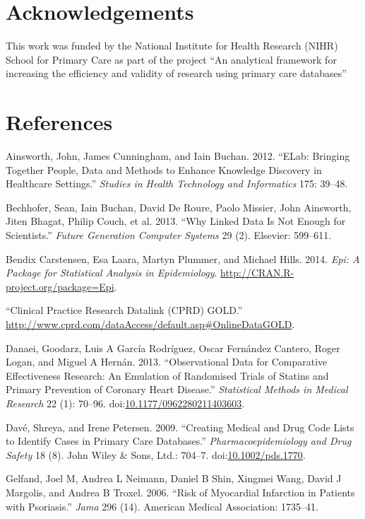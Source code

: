 \documentclass[]{article}
\begin{document}
\section{Acknowledgements}\label{acknowledgements}

This work was funded by the National Institute for Health Research
(NIHR) School for Primary Care as part of the project ``An analytical
framework for increasing the efficiency and validity of research using
primary care databases''

\section*{References}\label{references}

Ainsworth, John, James Cunningham, and Iain Buchan. 2012. ``ELab:
Bringing Together People, Data and Methods to Enhance Knowledge
Discovery in Healthcare Settings.'' \emph{Studies in Health Technology
and Informatics} 175: 39--48.

Bechhofer, Sean, Iain Buchan, David De Roure, Paolo Missier, John
Ainsworth, Jiten Bhagat, Philip Couch, et al. 2013. ``Why Linked Data Is
Not Enough for Scientists.'' \emph{Future Generation Computer Systems}
29 (2). Elsevier: 599--611.

Bendix Carstensen, Esa Laara, Martyn Plummer, and Michael Hills. 2014.
\emph{Epi: A Package for Statistical Analysis in Epidemiology}.
\url{http://CRAN.R-project.org/package=Epi}.

``Clinical Practice Research Datalink (CPRD) GOLD.''
\url{http://www.cprd.com/dataAccess/default.asp\#OnlineDataGOLD}.

Danaei, Goodarz, Luis A García Rodríguez, Oscar Fernández Cantero, Roger
Logan, and Miguel A Hernán. 2013. ``Observational Data for Comparative
Effectiveness Research: An Emulation of Randomised Trials of Statins and
Primary Prevention of Coronary Heart Disease.'' \emph{Statistical
Methods in Medical Research} 22 (1): 70--96.
doi:\href{http://dx.doi.org/10.1177/0962280211403603}{10.1177/0962280211403603}.

Davé, Shreya, and Irene Petersen. 2009. ``Creating Medical and Drug Code
Lists to Identify Cases in Primary Care Databases.''
\emph{Pharmacoepidemiology and Drug Safety} 18 (8). John Wiley \& Sons,
Ltd.: 704--7.
doi:\href{http://dx.doi.org/10.1002/pds.1770}{10.1002/pds.1770}.

Gelfand, Joel M, Andrea L Neimann, Daniel B Shin, Xingmei Wang, David J
Margolis, and Andrea B Troxel. 2006. ``Risk of Myocardial Infarction in
Patients with Psoriasis.'' \emph{Jama} 296 (14). American Medical
Association: 1735--41.
\end{document}
